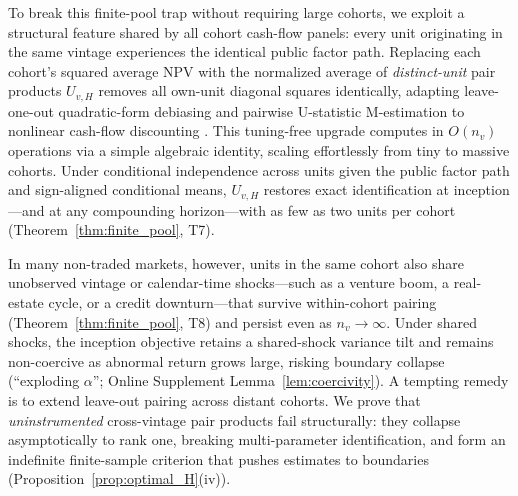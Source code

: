 \documentclass[12pt]{article}
\begin{document}
To break this finite-pool trap without requiring large cohorts, we exploit a structural feature shared by all cohort cash-flow panels: every unit originating in the same vintage experiences the identical public factor path.
Replacing each cohort's squared average NPV with the normalized average of \emph{distinct-unit} pair products $U_{v,H}$ removes all own-unit diagonal squares identically, adapting leave-one-out quadratic-form debiasing and pairwise U-statistic M-estimation to nonlinear cash-flow discounting \citep{HP94,AIK99,CSHNW12,CJN18,KSS20,MS22}.
This tuning-free upgrade computes in $O(n_v)$ operations via a simple algebraic identity, scaling effortlessly from tiny to massive cohorts.
Under conditional independence across units given the public factor path and sign-aligned conditional means, $U_{v,H}$ restores exact identification at inception---and at any compounding horizon---with as few as two units per cohort (Theorem~\ref{thm:finite_pool}, T7).

In many non-traded markets, however, units in the same cohort also share unobserved vintage or calendar-time shocks---such as a venture boom, a real-estate cycle, or a credit downturn---that survive within-cohort pairing (Theorem~\ref{thm:finite_pool}, T8) and persist even as $n_v \to \infty$.
Under shared shocks, the inception objective retains a shared-shock variance tilt and remains non-coercive as abnormal return grows large, risking boundary collapse (``exploding $\alpha$''; Online Supplement Lemma~\ref{lem:coercivity}).
A tempting remedy is to extend leave-out pairing across distant cohorts.
We prove that \emph{uninstrumented} cross-vintage pair products fail structurally: they collapse asymptotically to rank one, breaking multi-parameter identification, and form an indefinite finite-sample criterion that pushes estimates to boundaries (Proposition~\ref{prop:optimal_H}(iv)).
\end{document}
